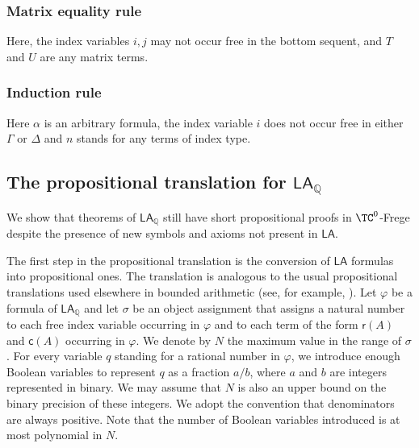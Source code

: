 \documentclass[11pt]{article}
\newcommand{\LA}{\mathsf{LA}}
\newcommand{\LAQ}{\mathsf{LA}_\mathbb{Q}}
\theoremstyle{definition}
\theoremstyle{plain}
\theoremstyle{remark}
\newcommand{\bQ}{\mathbb{Q}}
\begin{document}
\subsubsection*{Matrix equality rule}

\begin{prooftree}
\end{prooftree}

Here, the index variables $i, j$ may not occur free in the bottom sequent, and $T$ and $U$ are any matrix terms.

\subsubsection*{Induction rule}

\begin{prooftree}
\end{prooftree}
Here $\alpha$ is an arbitrary formula, the index variable $i$ does not occur free in either $\Gamma$ or $\Delta$ and $n$ stands for any terms of index type.

\subsection{The propositional translation for $\LAQ$}
\label{app:LAQ-trans}
We show that theorems of $\LAQ$ still have short propositional proofs in $\TC^0$-Frege despite the presence of new symbols and axioms not present in $\LA$.

The first step in the propositional translation is the conversion of $\LA$ formulas into propositional ones. The translation is analogous to the usual propositional translations used elsewhere in bounded arithmetic (see, for example, \cite{cookBOOK, krajicek95}). Let $\varphi$ be a formula of $\LA_\bQ$ and let $\sigma$ be an object assignment that assigns a natural number to each free index variable occurring in $\varphi$ and to each term of the form $\mathsf{r}(A)$ and $\mathsf{c}(A)$ occurring in $\varphi$. We denote by $N$ the maximum value in the range of $\sigma$. For every variable $q$ standing for a rational number in $\varphi$, we introduce enough Boolean variables to represent $q$ as a fraction $a/b$, where $a$ and $b$ are integers represented in binary. We may assume that $N$ is also an upper bound on the binary precision of these integers. We adopt the convention that denominators are always positive. Note that the number of Boolean variables introduced is at most polynomial in $N$.
\end{document}
